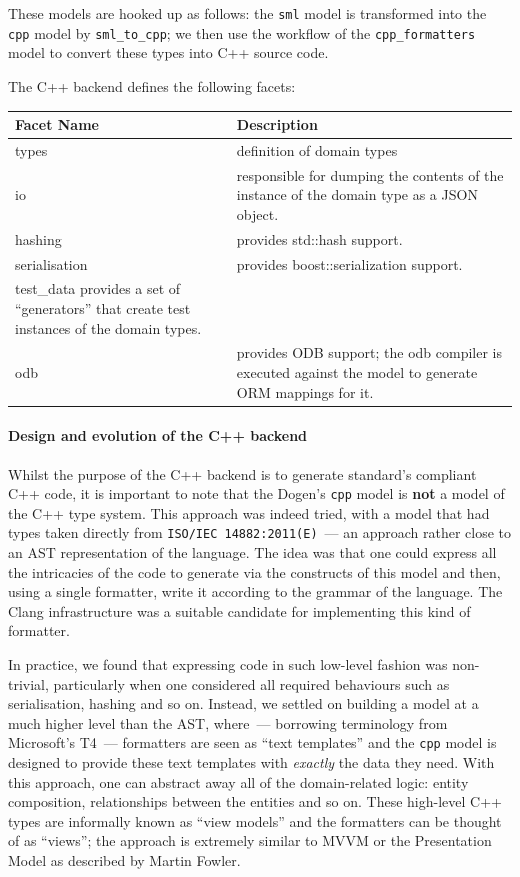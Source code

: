 \documentclass{book}
\begin{document}
These models are hooked up as follows: the \texttt{sml} model is
transformed into the \texttt{cpp} model by \texttt{sml\_to\_cpp}; we
then use the workflow of the \texttt{cpp\_formatters} model to convert
these types into C++ source code.

The C++ backend defines the following facets:

\begin{center}
\begin{tabular}{ll}
Facet Name & Description\\
\hline
types & definition of domain types\\
io & responsible for dumping the contents of the instance of the domain type as a JSON object.\\
hashing & provides std::hash support.\\
serialisation & provides boost::serialization support.\\
test\_data provides a set of ``generators'' that create test instances of the domain types.\\
odb & provides ODB support; the odb compiler is executed against the model to generate ORM mappings for it.\\
\end{tabular}
\end{center}

\paragraph{Design and evolution of the C++ backend}

Whilst the purpose of the C++ backend is to generate standard's
compliant C++ code, it is important to note that the Dogen's
\texttt{cpp} model is \textbf{not} a model of the C++ type
system. This approach was indeed tried, with a model that had types
taken directly from \texttt{ISO/IEC 14882:2011(E)}~--- an approach
rather close to an AST representation of the language. The idea was
that one could express all the intricacies of the code to generate via
the constructs of this model and then, using a single formatter, write
it according to the grammar of the language. The Clang infrastructure
was a suitable candidate for implementing this kind of formatter.

In practice, we found that expressing code in such low-level fashion
was non-trivial, particularly when one considered all required
behaviours such as serialisation, hashing and so on. Instead, we
settled on building a model at a much higher level than the AST,
where~--- borrowing terminology from Microsoft's T4~--- formatters are
seen as ``text templates'' and the \texttt{cpp} model is designed to
provide these text templates with \emph{exactly} the data they
need. With this approach, one can abstract away all of the
domain-related logic: entity composition, relationships between the
entities and so on. These high-level C++ types are informally known as
``view models'' and the formatters can be thought of as ``views''; the
approach is extremely similar to MVVM or the Presentation Model as
described by Martin Fowler.
\end{document}
